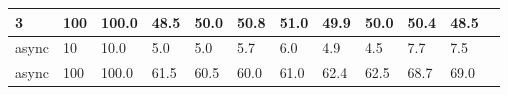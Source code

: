 \documentclass[12pt,a4paper]{report}
\begin{document}
\begin{table}[h]
\begin{tabular}{|l|l|l|l|l|l|l|l|l|l|l|l|}
		3                        & 100                                & 100.0                           & 48.5                        & 50.0                      & 50.8                           & 51.0   & 49.9 & 50.0   & 50.4 & 48.5   \\ \hline
		async                    & 10                                 & 10.0                            & 5.0                         & 5.0                       & 5.7                            & 6.0    & 4.9  & 4.5    & 7.7  & 7.5    \\ \hline
		async                    & 100                                & 100.0                           & 61.5                        & 60.5                      & 60.0                           & 61.0   & 62.4 & 62.5   & 68.7 & 69.0   \\ \hline
	\end{tabular}
\end{table}
\end{document}
